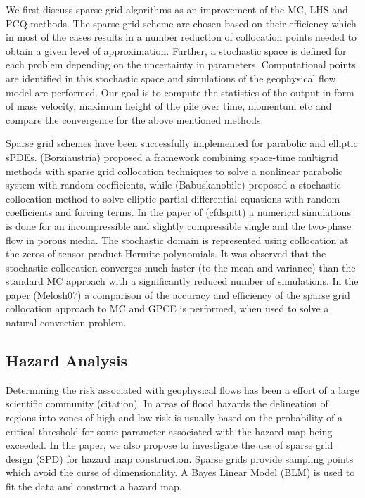 \documentclass{article}
\begin{document}
We first discuss sparse grid algorithms as an improvement of the MC, LHS and PCQ methods. 
The sparse grid scheme are chosen based on their efficiency which in most of the cases
results in a number reduction of collocation points needed to obtain a given level of approximation. 
Further, a stochastic space is defined for each problem depending on the uncertainty in
parameters. Computational points are identified in this stochastic space and simulations 
of the geophysical flow model are performed. Our goal is to compute the statistics of the 
output in form of mass velocity, maximum height of the pile over time, momentum etc and
compare the convergence for the above mentioned methods. 
 

Sparse grid schemes have been successfully implemented for parabolic and elliptic sPDEs.
(Borziaustria) proposed a framework combining space-time multigrid methods with sparse grid
collocation techniques to solve a nonlinear parabolic system with random coefficients, while
(Babuskanobile) proposed a stochastic collocation method to solve elliptic partial differential
equations with random coefficients and forcing terms. In the paper of (cfdspitt) a numerical 
simulations is done for an incompressible and slightly compressible single and the two-phase 
flow in porous media. The stochastic domain is represented using collocation at the zeros of 
tensor product Hermite polynomials. It was observed that the stochastic collocation converges
much faster (to the mean and variance) than the standard MC approach with a significantly 
reduced number of simulations. In the paper (Melosh07) a comparison of the accuracy and 
efficiency of the sparse grid collocation approach to MC and GPCE is performed, when used 
to solve a natural convection problem.

\subsection{Hazard Analysis} Determining the risk associated with geophysical flows has been a effort of a large scientific
community (citation). In areas of flood hazards the delineation of  regions into zones of high and low risk
is usually based on the probability of a critical threshold for some parameter associated with 
the hazard map being exceeded.
In the paper, we also propose to investigate the use of sparse grid design (SPD) for hazard 
map construction. Sparse grids provide sampling points which avoid the curse of dimensionality.
A Bayes Linear Model (BLM) is used to fit the data and construct a hazard map. 
\end{document}
